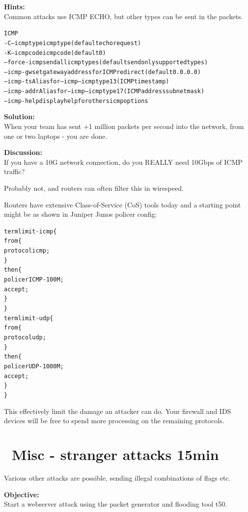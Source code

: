 \documentclass[a4paper,11pt,notitlepage]{report}
\begin{document}
{\bf Hints:}\\
Common attacks use ICMP ECHO, but other types can be sent in the packets.

\begin{alltt}\footnotesize
ICMP
  -C  --icmptype   icmp type (default echo request)
  -K  --icmpcode   icmp code (default 0)
      --force-icmp send all icmp types (default send only supported types)
      --icmp-gw    set gateway address for ICMP redirect (default 0.0.0.0)
      --icmp-ts    Alias for --icmp --icmptype 13 (ICMP timestamp)
      --icmp-addr  Alias for --icmp --icmptype 17 (ICMP address subnet mask)
      --icmp-help  display help for others icmp options
\end{alltt}


{\bf Solution:}\\
When your team has sent +1 million packets per second into the network, from one or two laptops - you are done.

{\bf Discussion:}\\
If you have a 10G network connection, do you REALLY need 10Gbps of ICMP traffic?

Probably not, and routers can often filter this in wirespeed.

Routers have extensive Class-of-Service (CoS) tools today and a starting point might be as shown in Juniper Junos policer config:

\begin{alltt}\footnotesize
term limit-icmp \{
    from \{
        protocol icmp;
    \}
    then \{
        policer ICMP-100M;
        accept;
    \}
\}
term limit-udp \{
    from \{
        protocol udp;
    \}
    then \{
        policer UDP-1000M;
        accept;
    \}
\}
\end{alltt}

This effectively limit the damage an attacker can do. Your firewall and IDS devices will be free to spend more processing on the remaining protocols.



\chapter{\faInfoCircle\ Misc - stranger attacks 15min}

Various other attacks are possible, sending illegal combinations of flags etc.



{\bf Objective:}\\
Start a webserver attack using the packet generator and flooding tool t50.
\end{document}
